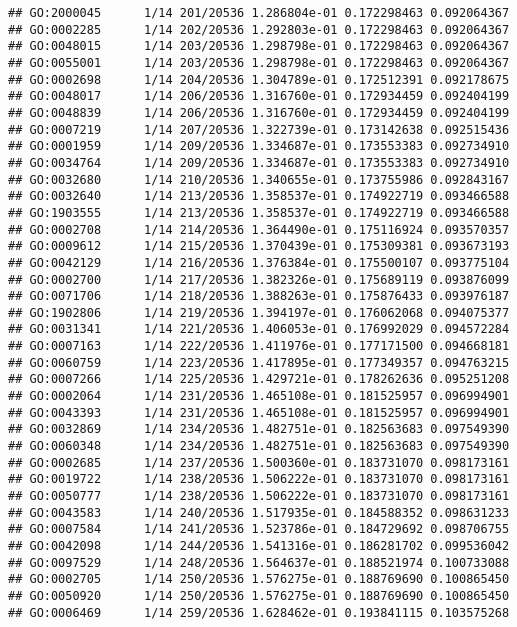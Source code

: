 \documentclass[
]{article}
\begin{document}
\begin{verbatim}
## GO:2000045      1/14 201/20536 1.286804e-01 0.172298463 0.092064367
## GO:0002285      1/14 202/20536 1.292803e-01 0.172298463 0.092064367
## GO:0048015      1/14 203/20536 1.298798e-01 0.172298463 0.092064367
## GO:0055001      1/14 203/20536 1.298798e-01 0.172298463 0.092064367
## GO:0002698      1/14 204/20536 1.304789e-01 0.172512391 0.092178675
## GO:0048017      1/14 206/20536 1.316760e-01 0.172934459 0.092404199
## GO:0048839      1/14 206/20536 1.316760e-01 0.172934459 0.092404199
## GO:0007219      1/14 207/20536 1.322739e-01 0.173142638 0.092515436
## GO:0001959      1/14 209/20536 1.334687e-01 0.173553383 0.092734910
## GO:0034764      1/14 209/20536 1.334687e-01 0.173553383 0.092734910
## GO:0032680      1/14 210/20536 1.340655e-01 0.173755986 0.092843167
## GO:0032640      1/14 213/20536 1.358537e-01 0.174922719 0.093466588
## GO:1903555      1/14 213/20536 1.358537e-01 0.174922719 0.093466588
## GO:0002708      1/14 214/20536 1.364490e-01 0.175116924 0.093570357
## GO:0009612      1/14 215/20536 1.370439e-01 0.175309381 0.093673193
## GO:0042129      1/14 216/20536 1.376384e-01 0.175500107 0.093775104
## GO:0002700      1/14 217/20536 1.382326e-01 0.175689119 0.093876099
## GO:0071706      1/14 218/20536 1.388263e-01 0.175876433 0.093976187
## GO:1902806      1/14 219/20536 1.394197e-01 0.176062068 0.094075377
## GO:0031341      1/14 221/20536 1.406053e-01 0.176992029 0.094572284
## GO:0007163      1/14 222/20536 1.411976e-01 0.177171500 0.094668181
## GO:0060759      1/14 223/20536 1.417895e-01 0.177349357 0.094763215
## GO:0007266      1/14 225/20536 1.429721e-01 0.178262636 0.095251208
## GO:0002064      1/14 231/20536 1.465108e-01 0.181525957 0.096994901
## GO:0043393      1/14 231/20536 1.465108e-01 0.181525957 0.096994901
## GO:0032869      1/14 234/20536 1.482751e-01 0.182563683 0.097549390
## GO:0060348      1/14 234/20536 1.482751e-01 0.182563683 0.097549390
## GO:0002685      1/14 237/20536 1.500360e-01 0.183731070 0.098173161
## GO:0019722      1/14 238/20536 1.506222e-01 0.183731070 0.098173161
## GO:0050777      1/14 238/20536 1.506222e-01 0.183731070 0.098173161
## GO:0043583      1/14 240/20536 1.517935e-01 0.184588352 0.098631233
## GO:0007584      1/14 241/20536 1.523786e-01 0.184729692 0.098706755
## GO:0042098      1/14 244/20536 1.541316e-01 0.186281702 0.099536042
## GO:0097529      1/14 248/20536 1.564637e-01 0.188521974 0.100733088
## GO:0002705      1/14 250/20536 1.576275e-01 0.188769690 0.100865450
## GO:0050920      1/14 250/20536 1.576275e-01 0.188769690 0.100865450
## GO:0006469      1/14 259/20536 1.628462e-01 0.193841115 0.103575268

\end{verbatim}
\end{document}
